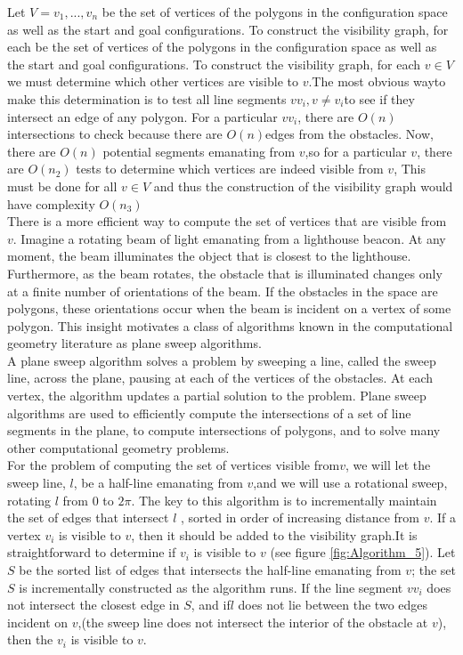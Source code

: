 \documentclass[11pt]{article}
\begin{document}
Let $V={v_1,...,v_n}$ be the set of vertices of the polygons in the configuration space as well as the start and goal configurations. To construct the visibility graph, for each be the set of vertices of the polygons in the configuration space as well as the start and goal configurations. To construct the visibility graph, for each $v \in V$ we must determine which other vertices are visible to $v$.The most obvious wayto make this determination is to test all line segments $vv_i,v \ne v_i$to see if they intersect an edge of any polygon. For a particular $vv_i$, there are $O(n)$ intersections to check because there are $O(n)$edges from the obstacles. Now, there are $O(n)$ potential segments emanating from $v$,so for a particular $v$, there are $O(n_2)$ tests to determine which vertices are indeed visible from $v$, This must be done for all $v \in V$ and thus the construction of the visibility graph would have complexity $O(n_3)$ \\
There is a more efficient way to compute the set of vertices that are visible from $v$. Imagine a rotating beam of light emanating from a lighthouse beacon. At any moment, the beam illuminates the object that is closest to the lighthouse. Furthermore, as the beam rotates, the obstacle that is illuminated changes only at a finite number of orientations of the beam. If the obstacles in the space are polygons, these orientations occur when the beam is incident on a vertex of some polygon. This insight motivates a class of algorithms known in the computational geometry literature as plane sweep algorithms.\\
A plane sweep algorithm solves a problem by sweeping a line, called the sweep line, across the plane, pausing at each of the vertices of the obstacles. At each vertex, the algorithm updates a partial solution to the problem. Plane sweep algorithms are used to efficiently compute the intersections of a set of line segments in the plane, to compute intersections of polygons, and to solve many other computational geometry problems.\\
For the problem of computing the set of vertices visible from$v$, we will let the sweep line, $l$, be a half-line emanating from $v$,and we will use a rotational sweep, rotating $l$ from 0 to $2\pi$. The key to this algorithm is to incrementally maintain the set of edges that intersect $l$ , sorted in order of increasing distance from $v$. If a vertex $v_i$ is visible to $v$, then it should be added to the visibility graph.It is straightforward to determine if $v_i$ is visible to $v$ (see figure \ref{fig:Algorithm_5}). Let $S$ be the sorted list of edges that intersects the half-line emanating from $v$; the set $S$ is incrementally constructed as the algorithm runs. If the line segment $vv_i$ does not intersect the closest edge in $S$, and if$l$ does not lie between the two edges incident on $v$,(the sweep line does not intersect the interior of the obstacle at $v$), then the $v_i$ is visible to $v$.\\
\newpage
\end{document}
